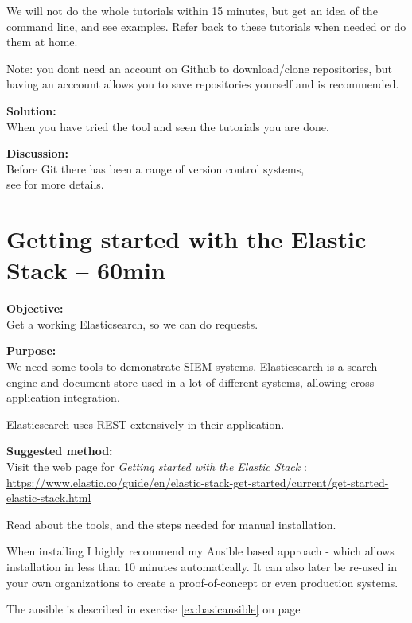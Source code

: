 \documentclass[a4paper,11pt,notitlepage]{report}
\begin{document}
We will not do the whole tutorials within 15 minutes, but get an idea of the command line, and see examples. Refer back to these tutorials when needed or do them at home.

Note: you dont need an account on Github to download/clone repositories, but having an acccount allows you to save repositories yourself and is recommended.

{\bf Solution:}\\
When you have tried the tool and seen the tutorials you are done.

{\bf Discussion:}\\
Before Git there has been a range of version control systems,\\
see  for more details.




\chapter{Getting started with the Elastic Stack -- 60min}
\label{gettingstartedelastic}



{\bf Objective:}\\
Get a working Elasticsearch, so we can do requests.

{\bf Purpose:}\\
We need some tools to demonstrate SIEM systems. Elasticsearch is a search engine and document store used in a lot of different systems, allowing cross application integration.

Elasticsearch uses REST extensively in their application.

{\bf Suggested method:}\\
Visit the web page for \emph{Getting started with the Elastic Stack} :\\
{\footnotesize\url{https://www.elastic.co/guide/en/elastic-stack-get-started/current/get-started-elastic-stack.html}}

Read about the tools, and the steps needed for manual installation.

When installing I highly recommend my Ansible based approach - which allows installation in less than 10 minutes automatically. It can also later be re-used in your own organizations to create a proof-of-concept or even production systems.

The ansible is described in exercise \ref{ex:basicansible} on page \pageref{ex:basicansible}
\end{document}

